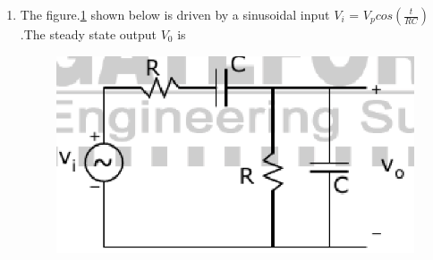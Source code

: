 \documentclass[journal,12pt,twocolumn]{IEEEtran}
\begin{document}
\begin{enumerate}
\item The figure.\ref{fig79} shown below is driven by a sinusoidal input $ V_{i} $ = $V_{p}cos(\frac{t}{RC})$ .The steady state output $V_{0}$ is
\begin{enumerate}
\setlength\itemsep{2em}
\begin{figure}[!h]
\begin{center}
\includegraphics[scale=0.7]{./figs/fig79.eps}
\caption{}
\label{fig79}
\end{center}
\end{figure}
\end{enumerate}


\end{enumerate}
\end{document}
